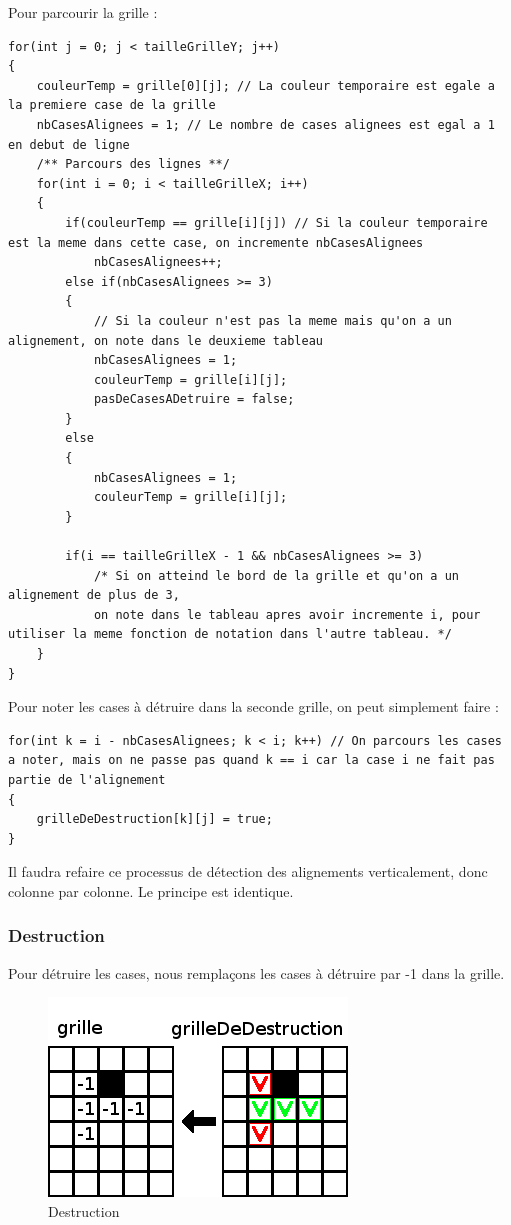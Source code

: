 Pour parcourir la grille :

\begin{lstlisting}
for(int j = 0; j < tailleGrilleY; j++)
{
	couleurTemp = grille[0][j]; // La couleur temporaire est egale a la premiere case de la grille
	nbCasesAlignees = 1; // Le nombre de cases alignees est egal a 1 en debut de ligne
	/** Parcours des lignes **/
	for(int i = 0; i < tailleGrilleX; i++)
	{
		if(couleurTemp == grille[i][j]) // Si la couleur temporaire est la meme dans cette case, on incremente nbCasesAlignees
			nbCasesAlignees++;
		else if(nbCasesAlignees >= 3)
		{
			// Si la couleur n'est pas la meme mais qu'on a un alignement, on note dans le deuxieme tableau
			nbCasesAlignees = 1;
			couleurTemp = grille[i][j];
			pasDeCasesADetruire = false;
		}
		else
		{
			nbCasesAlignees = 1;
			couleurTemp = grille[i][j];
		}

		if(i == tailleGrilleX - 1 && nbCasesAlignees >= 3) 
			/* Si on atteind le bord de la grille et qu'on a un alignement de plus de 3,
			on note dans le tableau apres avoir incremente i, pour utiliser la meme fonction de notation dans l'autre tableau. */
	}
} 
\end{lstlisting}
		Pour noter les cases à détruire dans la seconde grille, on peut simplement faire :
\begin{lstlisting}
for(int k = i - nbCasesAlignees; k < i; k++) // On parcours les cases a noter, mais on ne passe pas quand k == i car la case i ne fait pas partie de l'alignement
{
	grilleDeDestruction[k][j] = true;
}
\end{lstlisting}

Il faudra refaire ce processus de détection des alignements verticalement, donc colonne par colonne. Le principe est identique.

\subsubsection{Destruction}

Pour détruire les cases, nous remplaçons les cases à détruire par -1 dans la grille.

\begin{figure}[position]
	\center
	\caption{\label{Destruction} Destruction}
	\includegraphics{imgs/Destruction}
\end{figure}

